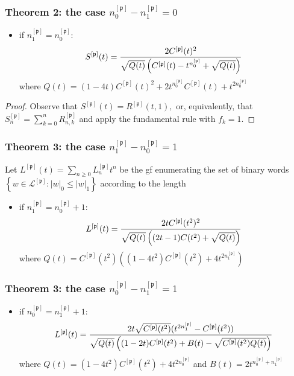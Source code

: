 \documentclass{beamer}
\begin{document}
\begin{frame}\frametitle{Theorem 2: the case $n_0^{[\mathfrak{p}]}-n_1^{[\mathfrak{p}]}=0$}
\begin{itemize}
\item if $n_1^{[\mathfrak{p}]}=n_0^{[\mathfrak{p}]}:$
$$S^{[\mathfrak{p}]}(t)={2C^{[\mathfrak{p}]}(t)^2 \over \sqrt{Q(t)}
    \left(C^{[\mathfrak{p}]}(t)-t^{n_0^{[\mathfrak{p}]}}+ \sqrt{Q(t)} \right) }$$
where $Q(t)=(1-4t)C^{[\mathfrak{p}]}(t)^2+2t^{n_0^{[\mathfrak{p}]}}C^{[\mathfrak{p}]}(t)+t^{2n_0^{[\mathfrak{p}]}}$
\end{itemize}

\begin{proof}
Observe that $S^{[\mathfrak{p}]}(t)=R^{[\mathfrak{p}]}(t,1),$ or, equivalently, that
$S_n^{[\mathfrak{p}]}=\sum_{k=0}^nR_{n, k}^{[\mathfrak{p}]}$ and apply the
fundamental rule with $f_k=1$.
\end{proof}
\end{frame}


\begin{frame}\frametitle{Theorem 3: the case $n_1^{[\mathfrak{p}]}-n_0^{[\mathfrak{p}]}=1$}
Let $L^{[\mathfrak{p}]}(t)=\sum_{n\geq 0}L_n^{[\mathfrak{p}]}t^n$ be the
gf enumerating the set of binary words $\left\lbrace
w\in\mathcal{L}^{[\mathfrak{p}]} : |w|_0\leq |w|_1\right\rbrace$ according to
the length

\begin{itemize}
\item if $n_1^{[\mathfrak{p}]}=n_0^{[\mathfrak{p}]}+1:$
$$L^{[\mathfrak{p}]}(t)= {2tC^{[\mathfrak{p}]}(t^2)^2 \over \sqrt{Q(t)}\left((2t-1)C(t^2)+ \sqrt{ Q(t) } \right)}$$
where $Q(t)=C^{[\mathfrak{p}]}(t^2)\left( (1-4t^2)C^{[\mathfrak{p}]}(t^2)+4t^{2n_1^{[\mathfrak{p}]}}\right)$
\end{itemize}
\end{frame}

\begin{frame}\frametitle{Theorem 3: the case $n_0^{[\mathfrak{p}]}-n_1^{[\mathfrak{p}]}=1$}
\begin{itemize}
\item if $n_0^{[\mathfrak{p}]}=n_1^{[\mathfrak{p}]}+1:$
$$L^{[\mathfrak{p}]}(t)={2t\sqrt{C^{[\mathfrak{p}]}(t^2)}(t^{2n_1^{[\mathfrak{p}]}}-C^{[\mathfrak{p}]}(t^2))
\over \sqrt{ Q(t) }\left((1-2t)C^{[\mathfrak{p}]}(t^2)+ B(t) - \sqrt{C^{[\mathfrak{p}]}(t^2) Q(t) } \right)}$$
where $Q(t)=(1-4t^2)C^{[\mathfrak{p}]}(t^2)+4t^{2n_0^{[\mathfrak{p}]}}$ and
$B(t)=2t^{n_0^{[\mathfrak{p}]} +n_1^{[\mathfrak{p}]}}$
\end{itemize}
\end{frame}
\end{document}
